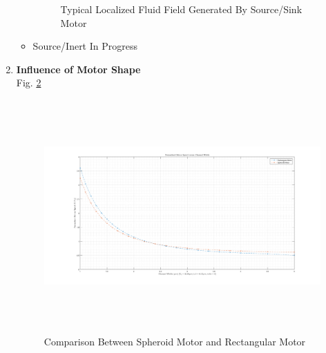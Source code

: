\documentclass[fontsize=11pt, %
                             paper=a4, %
                             twoside, %
                             captions=tableheading,
                             index=totoc,
                             hyperref]{labbook}
\begin{document}
\begin{addmargin}[4cm]{0cm}
\begin{enumerate}
\begin{itemize}
\begin{figure}
\caption{Typical Localized Fluid Field Generated By Source/Sink Motor}\label{2016-12-18-TLFFGBSSM}
\end{figure}
\item Source/Inert In Progress
\end{itemize}
\item \textbf{Influence of Motor Shape}\\
Fig. \ref{2016-12-18-CBSMARM}
\begin{figure}
\centering
\includegraphics[width=\linewidth, height=3.5in]{2016-12-18-InfluenceOfMotorShape.png}
\caption{Comparison Between Spheroid Motor and Rectangular Motor}\label{2016-12-18-CBSMARM}
\end{figure}
\end{enumerate}


\end{addmargin}
\end{document}
